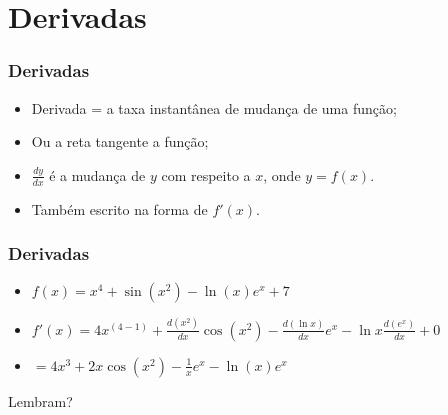 \section{Derivadas}

\begin{frame}
\frametitle{Derivadas}

  \begin{itemize}[<+-| alert@+>]
    \item Derivada = a taxa instantânea de mudança de uma função;
    \item Ou a reta tangente a função;
    \item $\frac{dy}{dx}$ é a mudança de $y$ com respeito a $x$, onde
          $y = f(x)$.
    \item Também escrito na forma de $f'(x)$.
  \end{itemize}

\end{frame}


\begin{frame}
\frametitle{Derivadas}

  \begin{itemize}[<+-| alert@+>]
    \item $f(x) = x^4 + \sin(x^2) - \ln(x)e^x + 7$
    \item $f'(x) = 4x^{(4-1)} + \frac{d(x^2)}{dx}\cos(x^2) -
          \frac{d(\ln x)}{dx}e^x - \ln x\frac{d(e^x)}{dx}+ 0$
    \item $= 4x^3 + 2x\cos(x^2) - \frac{1}{x}e^x - \ln(x)e^x$
  \end{itemize}

  \pause Lembram?

\end{frame}


